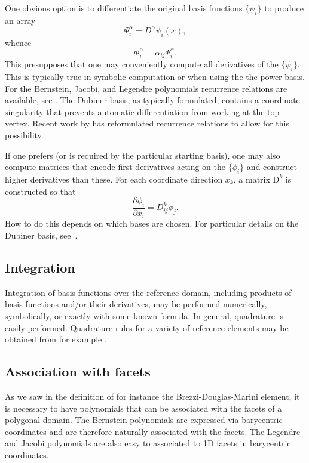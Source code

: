 One obvious option is to differentiate the
original basis functions $\{ \psi_i \}$ to produce an array
\begin{equation}
\Psi^\alpha_i = D^\alpha \psi_i(x),
\end{equation}
whence
\begin{equation}
\Phi^\alpha_i = \alpha_{ij} \Psi^\alpha_i.
\end{equation}
This presupposes that one may conveniently compute all derivatives of
the $\{ \psi_i \}$.  This is typically true in symbolic computation
or when using the the power basis.  For the Bernstein, Jacobi,
and Legendre polynomials recurrence relations are available, see
\citep{KarniadakisSherwin2005,Kirby2010}.  The Dubiner basis, as
typically formulated, contains a coordinate singularity that prevents
automatic differentiation from working at the top vertex.  Recent work
by \citet{Kirby} has reformulated recurrence relations to allow for
this possibility.

If one prefers (or is required by the particular starting basis), one
may also compute matrices that encode first derivatives acting on the
$\{ \phi_i \}$ and construct higher derivatives than these.  For each
coordinate direction $x_k$, a matrix $\mathrm{D}^k$ is constructed so that
\begin{equation}
\frac{\partial \phi_i}{\partial x_i} =
D^k_{ij} \phi_j.
\end{equation}
How to do this depends on which bases are chosen.  For particular details
on the Dubiner basis, see~\citep{Dubiner1991}.


\subsection{Integration}

Integration of basis functions over the reference domain, including
products of basis functions and/or their derivatives, may be performed
numerically, symbolically, or exactly with some known formula.
In general, quadrature is easily performed.  Quadrature rules for
a variety of reference elements may be obtained from for example
\citep{Dunavant1985,KeeganRidzalBochev2008,SolinSegethDolevzel2004}.


\subsection{Association with facets}

As we saw in the definition of for instance the Brezzi-Douglas-Marini
element, it is necessary to have polynomials that can be associated with
the facets of a polygonal domain. The Bernstein polynomials are expressed
via barycentric coordinates and are therefore naturally associated
with the facets. The Legendre and Jacobi polynomials are also easy to
associated to 1D facets in barycentric coordinates.

